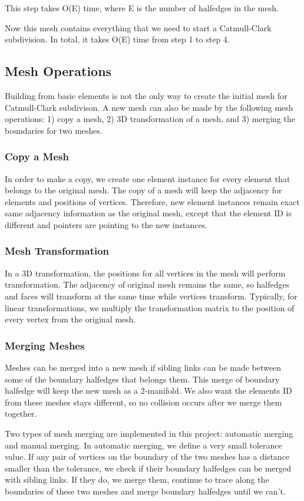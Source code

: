 \documentclass[12pt]{article}
\begin{document}
This step takes O(E) time, where E is the number of halfedges in the mesh.

Now this mesh contains everything that we need to start a Catmull-Clark subdivision. In total, it takes O(E) time from step 1 to step 4.

\subsection{Mesh Operations}
Building from basic elements is not the only way to create the initial mesh for Catmull-Clark subdivison. A new mesh can also be made by the following mesh operations: 1) copy a mesh, 2) 3D transformation of a mesh, and 3) merging the boundaries for two meshes. 

\subsubsection{Copy a Mesh}
In order to make a copy, we create one element instance for every element that belongs to the original mesh. The copy of a mesh will keep the adjacency for elements and positions of vertices. Therefore, new element instances remain exact same adjacency information as the original mesh, except that the element ID is different and pointers are pointing to the new instances. 

\subsubsection{Mesh Transformation}
In a 3D transformation, the positions for all vertices in the mesh will perform transformation. The adjacency of original mesh remains the same, so halfedges and faces will transform at the same time while vertices transform. Typically, for linear transformations, we multiply the transformation matrix to the position of every vertex from the original mesh.

\subsubsection{Merging Meshes}
Meshes can be merged into a new mesh if sibling links can be made between some of the boundary halfedges that belongs them. This merge of boundary halfedge will keep the new mesh as a 2-manifold. We also want the elements ID from these meshes stays different, so no collision occurs after we merge them together.

Two types of mesh merging are implemented in this project: automatic merging and manual merging. In automatic merging, we define a very small tolerance value. If any pair of vertices on the boundary of the two meshes has a distance smaller than the tolerance, we check if their boundary halfedges can be merged with sibling links. If they do, we merge them, continue to trace along the boundaries of these two meshes and merge boundary halfedges until we can't.
\end{document}
